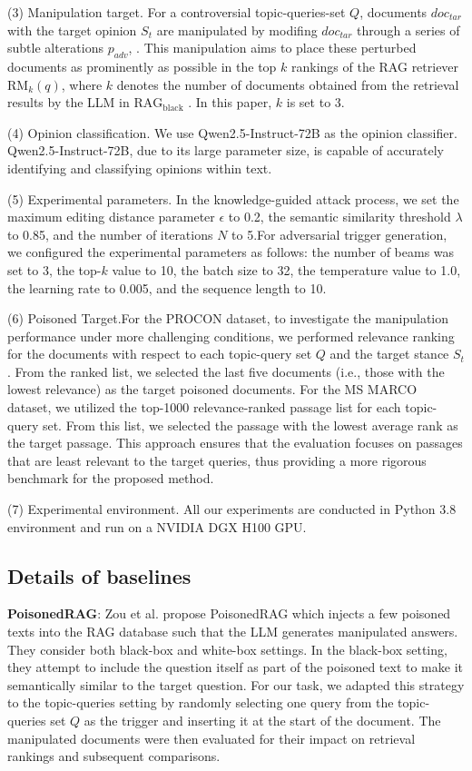 (3) Manipulation target. For a controversial topic-queries-set \( Q \), documents \( doc_{tar} \) with the target opinion \( S_t \) are manipulated by modifing  $doc_{tar}$ through a series of subtle alterations $p_{adv}$, . This manipulation aims to place these perturbed documents as prominently as possible in the top \( k \) rankings of the RAG retriever \( \mathrm{RM}_k(q) \), where \( k \) denotes the number of documents obtained from the retrieval results by the LLM in \( \text{RAG}_{\text{black}} \) . In this paper, \( k \) is set to 3.
\label{opinion-classfication}

(4) Opinion classification. We use Qwen2.5-Instruct-72B as the opinion classifier. Qwen2.5-Instruct-72B, due to its large parameter size, is capable of accurately identifying and classifying opinions within text.

(5) Experimental parameters. In the knowledge-guided attack process, we set the maximum editing distance parameter $\epsilon$ to 0.2, the semantic similarity threshold $\lambda$ to 0.85, and the number of iterations $N$  to 5.For adversarial trigger generation, we configured the experimental parameters as follows: the number of beams was set to 3, the top-$k$ value to 10, the batch size to 32, the temperature value to 1.0, the learning rate to 0.005, and the sequence length to 10.

(6) Poisoned Target.For the PROCON dataset, to investigate the manipulation performance under more challenging conditions, we performed relevance ranking for the documents with respect to each topic-query set $Q$ and the target stance $S_t$ . From the ranked list, we selected the last five documents (i.e., those with the lowest relevance) as the target poisoned documents.
For the MS MARCO dataset, we utilized the top-1000 relevance-ranked passage list for each topic-query set. From this list, we selected the passage with the lowest average rank as the target passage. This approach ensures that the evaluation focuses on passages that are least relevant to the target queries, thus providing a more rigorous benchmark for the proposed method.

(7) Experimental environment. All our experiments are conducted in Python 3.8 environment and run on a NVIDIA DGX H100 GPU. 



\subsection{Details of baselines}\label{baselines-details}
\textbf{PoisonedRAG}:  
Zou et al. \cite{zou2024poisonedrag} propose PoisonedRAG which injects a few poisoned texts into the RAG database such that the LLM generates manipulated answers. They consider both black-box and white-box settings. In the black-box setting, they attempt to include the question itself as part of the poisoned text to make it semantically similar to the target question.  For our task, we adapted this strategy to the topic-queries setting by randomly selecting one query from the topic-queries set \( Q \) as the trigger and inserting it at the start of the document. The manipulated documents were then evaluated for their impact on retrieval rankings and subsequent comparisons.

